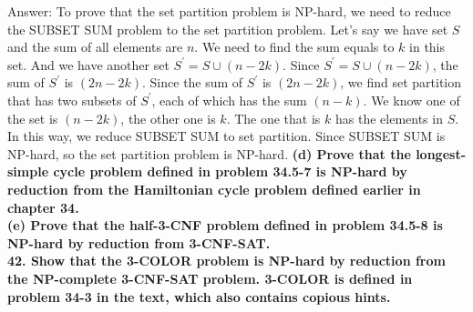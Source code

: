 \documentclass{article}
\begin{document}
Answer: To prove that the set partition problem is NP-hard, we need to reduce the SUBSET SUM problem to the set partition problem. Let's say we have set $S$ and the sum of all elements are $n$. We need to find the sum equals to $k$ in this set. And we have another set $S^{'} = S\cup (n-2k)$. Since $S^{'} = S\cup (n-2k)$, the sum of $S^{'}$ is $(2n-2k)$.  Since the sum of $S^{'}$ is $(2n-2k)$, we find set partition that has two subsets of $S^{'}$, each of which has the sum $(n-k)$. We know one of the set is $(n-2k)$, the other one is $k$. The one that is $k$ has the elements in $S$. In this way, we reduce SUBSET SUM to set partition. Since SUBSET SUM is NP-hard, so the set partition problem is NP-hard. 
\textbf{(d) Prove that the longest-simple cycle problem defined in problem 34.5-7 is NP-hard by reduction from the Hamiltonian cycle problem defined earlier in chapter 34.} \\ \newline
\textbf{(e) Prove that the half-3-CNF problem defined in problem 34.5-8 is NP-hard by reduction from 3-CNF-SAT.} \\ \newline
\textbf{42. Show that the 3-COLOR problem is NP-hard by reduction from the NP-complete 3-CNF-SAT problem. 3-COLOR is defined in problem 34-3 in the text, which also contains copious hints.}
\end{document}

